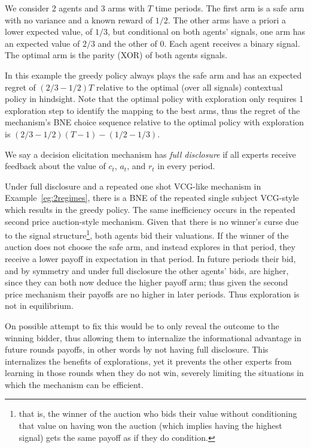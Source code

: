 \begin{eg}\label{eg:2regimes}
We consider 2 agents and 3 arms with $T$ time periods. The first arm is a safe arm with no variance and a known reward of $1/2$. The other arms have a priori a lower expected value, of $1/3$, but conditional on both agents' signals, one arm has an expected value of $2/3$ and the other of $0$. 
Each agent receives a binary signal. The optimal arm is the parity (XOR) of both agents signals. 
\end{eg}

In this example the greedy policy always plays the safe arm and has an expected regret of $(2/3 - 1/2)T$ relative to the optimal (over all signals) contextual policy in hindsight.
Note that the optimal policy with exploration only requires 1 exploration step to identify the mapping to the best arms, thus the regret of the mechanism's BNE choice sequence relative to the optimal policy with exploration is $(2/3 - 1/2)(T-1) - (1/2-1/3) $. 


\begin{defn}
  We say a decision elicitation mechanism has \emph{full disclosure} if all experts receive feedback about the value of $c_t$, $a_t$, and $r_t$ in every period.
 \end{defn}


Under full disclosure and a repeated one shot VCG-like mechanism in Example~\ref{eg:2regimes}, there is a BNE of the repeated single subject VCG-style which results in the greedy policy.
The same inefficiency occurs in the repeated second price auction-style mechanism.
Given that there is no winner's curse due to the signal structure\footnote{that is, the winner of the auction who  bids their value without conditioning that value on having won the auction (which implies having the highest signal) gets the same payoff as if they do condition.}, both agents bid their valuations.
If the winner of the auction does not choose the safe arm, and instead explores in that period, they receive a lower payoff in expectation in that period. In future periods their bid, and by symmetry and under full disclosure the other agents' bids, are higher, since they can both now deduce the higher payoff arm; thus given the second price mechanism their payoffs are no higher in later periods. Thus exploration is not in equilibrium. 


On possible attempt to fix this would be to only reveal the outcome to the winning bidder, thus allowing them to internalize the informational advantage in future rounds payoffs, in other words by not having full disclosure.
This internalizes the benefits of explorations, yet it prevents the other experts from learning in those rounds when they do not win, severely limiting the situations in which the mechanism can be efficient.

